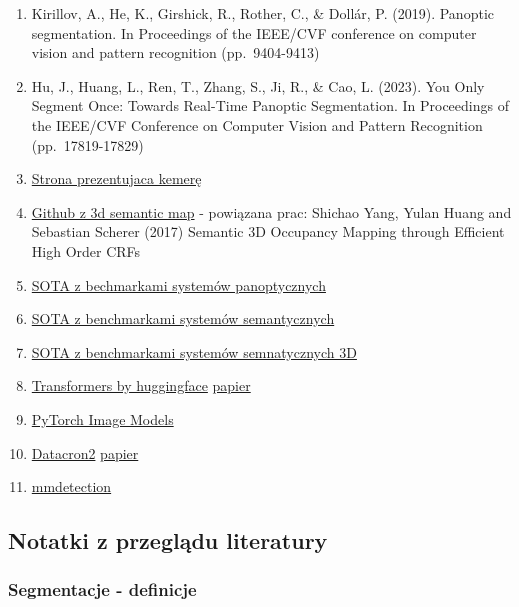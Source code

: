 \documentclass[
]{article}
\begin{document}
\begin{enumerate}
\def\labelenumi{\arabic{enumi}.}
\item
  Kirillov, A., He, K., Girshick, R., Rother, C., \& Dollár, P. (2019). Panoptic segmentation. In Proceedings of the IEEE/CVF conference on computer vision and pattern recognition (pp.~9404-9413)
\item
  Hu, J., Huang, L., Ren, T., Zhang, S., Ji, R., \& Cao, L. (2023). You Only Segment Once: Towards Real-Time Panoptic Segmentation. In Proceedings of the IEEE/CVF Conference on Computer Vision and Pattern Recognition (pp.~17819-17829)
\item
  \href{https://www.intelrealsense.com/depth-camera-d435/}{Strona prezentujaca kemerę}
\item
  \href{https://github.com/shichaoy/semantic_3d_mapping?tab=readme-ov-file}{Github z 3d semantic map} - powiązana prac: Shichao Yang, Yulan Huang and Sebastian Scherer (2017) Semantic 3D Occupancy Mapping through Efficient High Order CRFs
\item
  \href{https://paperswithcode.com/task/panoptic-segmentation}{SOTA z bechmarkami systemów panoptycznych}
\item
  \href{https://paperswithcode.com/task/semantic-segmentation}{SOTA z benchmarkami systemów semantycznych}
\item
  \href{https://paperswithcode.com/task/3d-semantic-segmentation}{SOTA z benchmarkami systemów semnatycznych 3D}
\item
  \href{https://github.com/huggingface/transformers}{Transformers by huggingface} \href{https://aclanthology.org/2020.emnlp-demos.6.pdf}{papier}
\item
  \href{https://github.com/huggingface/pytorch-image-models?tab=readme-ov-file}{PyTorch Image Models}
\item
  \href{https://github.com/facebookresearch/detectron2}{Datacron2} \href{https://github.com/facebookresearch/detectron2/blob/main/MODEL_ZOO.md}{papier}
\item
  \href{https://github.com/open-mmlab/mmdetection}{mmdetection}
\end{enumerate}

\subsection{Notatki z przeglądu literatury}\label{notatki-z-przeglux105du-literatury}

\subsubsection{Segmentacje - definicje}\label{segmentacje---definicje}
\end{document}
